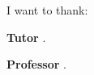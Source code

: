 \thispagestyle{empty}
\vspace*{2cm}
I want to thank:

\medskip
\noindent
\textbf{Tutor} .

\medskip
\noindent
\textbf{Professor} .


\medskip
{}